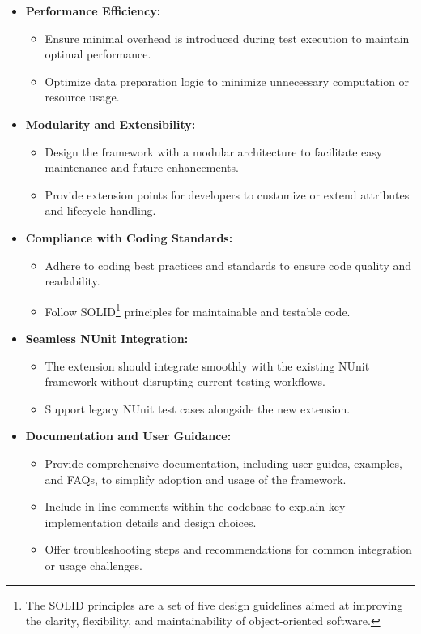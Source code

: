 \begin{itemize}
	\item \textbf{Performance Efficiency:}
	      \begin{itemize}
		      \item Ensure minimal overhead is introduced during test execution to maintain optimal performance.
		      \item Optimize data preparation logic to minimize unnecessary computation or resource usage.
	      \end{itemize}

	\item \textbf{Modularity and Extensibility:}
	      \begin{itemize}
		      \item Design the framework with a modular architecture to facilitate easy maintenance and future enhancements.
		      \item Provide extension points for developers to customize or extend attributes and lifecycle handling.
	      \end{itemize}

	\item \textbf{Compliance with Coding Standards:}
	      \begin{itemize}
		      \item Adhere to coding best practices and standards to ensure code quality and readability.
		      \item Follow SOLID\footnote{The SOLID principles are a set of five design guidelines aimed at improving the clarity, flexibility, and maintainability of object-oriented software.} principles for maintainable and testable code.
	      \end{itemize}

	\item \textbf{Seamless NUnit Integration:}
	      \begin{itemize}
		      \item The extension should integrate smoothly with the existing NUnit framework without disrupting current testing workflows.
		      \item Support legacy NUnit test cases alongside the new extension.
	      \end{itemize}
	\item \textbf{Documentation and User Guidance:}
	      \begin{itemize}
		      \item Provide comprehensive documentation, including user guides, examples, and FAQs, to simplify adoption and usage of the framework.
		      \item Include in-line comments within the codebase to explain key implementation details and design choices.
		      \item Offer troubleshooting steps and recommendations for common integration or usage challenges.
	      \end{itemize}
\end{itemize}

